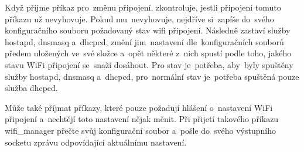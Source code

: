 Když příjme příkaz pro~změnu připojení, zkontroluje, jestli připojení tomuto příkazu už nevyhovuje. Pokud mu~nevyhovuje, nejdříve si~zapíše do~svého konfiguračního souboru požadovaný stav wifi připojení. Následně zastaví služby hostapd, dnsmasq a~dhcpcd, změní jim~nastavení dle~konfiguračních souborů předem uložených ve~své složce a~opět některé z~nich spustí podle toho, jakého stavu WiFi připojení se~snaží dosáhout.
Pro  stav je~potřeba, aby~byly spuštěny služby hostapd, dnsmasq a~dhcpcd, pro~normální  stav je~potřeba spuštěná pouze služba dhcpcd.

Může také příjmat příkazy, které pouze požadují hlášení o~nastavení WiFi připojení a~nechtějí toto nastavení nějak měnit. Při přijetí takového příkazu wifi\_manager přečte svůj konfigurační soubor a~pošle do~svého výstupního socketu zprávu odpovídající aktuálnímu nastavení.
